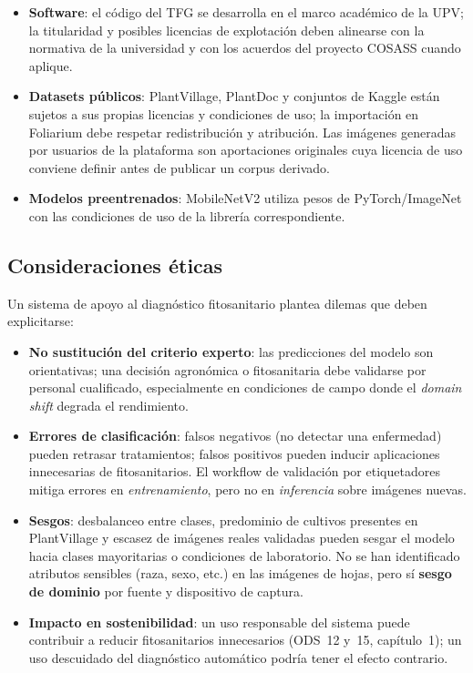 \documentclass[11pt,spanish,listoffigures,listoftables]{tfgetsinf}
\begin{document}
\begin{itemize}
    \item \textbf{Software}: el código del TFG se desarrolla en el marco académico de la UPV; la titularidad y posibles licencias de explotación deben alinearse con la normativa de la universidad y con los acuerdos del proyecto COSASS cuando aplique.
    \item \textbf{Datasets públicos}: PlantVillage, PlantDoc y conjuntos de Kaggle están sujetos a sus propias licencias y condiciones de uso; la importación en Foliarium debe respetar redistribución y atribución. Las imágenes generadas por usuarios de la plataforma son aportaciones originales cuya licencia de uso conviene definir antes de publicar un corpus derivado.
    \item \textbf{Modelos preentrenados}: MobileNetV2 utiliza pesos de PyTorch/ImageNet con las condiciones de uso de la librería correspondiente.
\end{itemize}

\subsection{Consideraciones éticas}

Un sistema de apoyo al diagnóstico fitosanitario plantea dilemas que deben explicitarse:

\begin{itemize}
    \item \textbf{No sustitución del criterio experto}: las predicciones del modelo son orientativas; una decisión agronómica o fitosanitaria debe validarse por personal cualificado, especialmente en condiciones de campo donde el \textit{domain shift} degrada el rendimiento.
    \item \textbf{Errores de clasificación}: falsos negativos (no detectar una enfermedad) pueden retrasar tratamientos; falsos positivos pueden inducir aplicaciones innecesarias de fitosanitarios. El workflow de validación por etiquetadores mitiga errores en \textit{entrenamiento}, pero no en \textit{inferencia} sobre imágenes nuevas.
    \item \textbf{Sesgos}: desbalanceo entre clases, predominio de cultivos presentes en PlantVillage y escasez de imágenes reales validadas pueden sesgar el modelo hacia clases mayoritarias o condiciones de laboratorio. No se han identificado atributos sensibles (raza, sexo, etc.) en las imágenes de hojas, pero sí \textbf{sesgo de dominio} por fuente y dispositivo de captura.
    \item \textbf{Impacto en sostenibilidad}: un uso responsable del sistema puede contribuir a reducir fitosanitarios innecesarios (ODS~12 y~15, capítulo~1); un uso descuidado del diagnóstico automático podría tener el efecto contrario.
\end{itemize}
\end{document}
